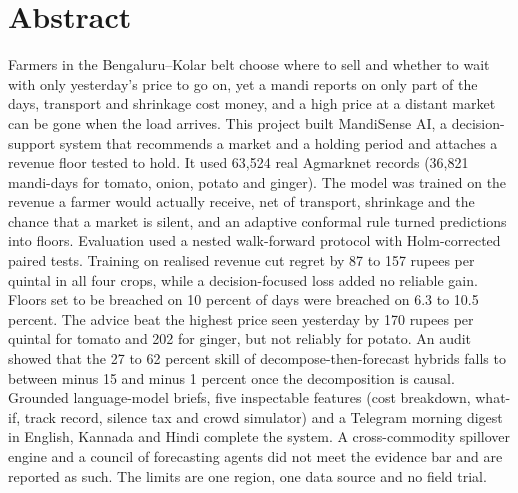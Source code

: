 \chapter*{\centering Abstract}

\noindent Farmers in the Bengaluru--Kolar belt choose where to sell and whether to wait with only yesterday's price to go on, yet a mandi reports on only part of the days, transport and shrinkage cost money, and a high price at a distant market can be gone when the load arrives. This project built MandiSense AI, a decision-support system that recommends a market and a holding period and attaches a revenue floor tested to hold. It used 63,524 real Agmarknet records (36,821 mandi-days for tomato, onion, potato and ginger). The model was trained on the revenue a farmer would actually receive, net of transport, shrinkage and the chance that a market is silent, and an adaptive conformal rule turned predictions into floors. Evaluation used a nested walk-forward protocol with Holm-corrected paired tests. Training on realised revenue cut regret by 87 to 157 rupees per quintal in all four crops, while a decision-focused loss added no reliable gain. Floors set to be breached on 10 percent of days were breached on 6.3 to 10.5 percent. The advice beat the highest price seen yesterday by 170 rupees per quintal for tomato and 202 for ginger, but not reliably for potato. An audit showed that the 27 to 62 percent skill of decompose-then-forecast hybrids falls to between minus 15 and minus 1 percent once the decomposition is causal. Grounded language-model briefs, five inspectable features (cost breakdown, what-if, track record, silence tax and crowd simulator) and a Telegram morning digest in English, Kannada and Hindi complete the system. A cross-commodity spillover engine and a council of forecasting agents did not meet the evidence bar and are reported as such. The limits are one region, one data source and no field trial.
